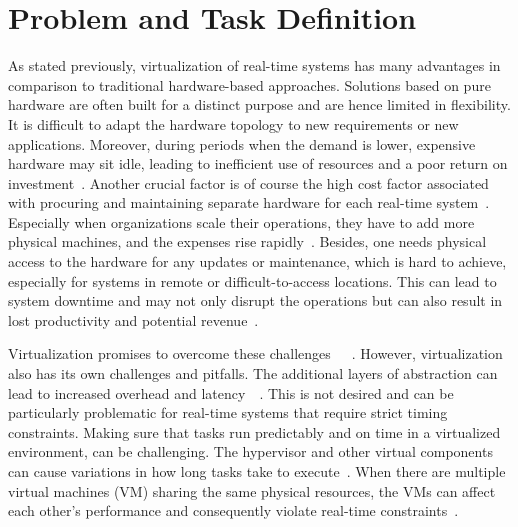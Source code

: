 \documentclass[MMR,Master,english]{twbook}
\begin{document}
\section{Problem and Task Definition}
As stated previously, virtualization of real-time systems has many advantages in comparison to traditional hardware-based approaches. Solutions based on pure hardware are often built for a distinct purpose and are hence limited in flexibility. It is difficult to adapt the hardware topology to new requirements or new applications. Moreover, during periods when the demand is lower, expensive hardware may sit idle, leading to inefficient use of resources and a poor return on investment~\cite{gabrielResourceAwareParameterTuning2019}. Another crucial factor is of course the high cost factor associated with procuring and maintaining separate hardware for each real-time system~\cite{bhardwajVirtualizationCloudComputing2021}. Especially when organizations scale their operations, they have to add more physical machines, and the expenses rise rapidly~\cite{abbasiExploringOpenStackScalable2023}. Besides, one needs physical access to the hardware for any updates or maintenance, which is hard to achieve, especially for systems in remote or difficult-to-access locations. This can lead to system downtime and may not only disrupt the operations but can also result in lost productivity and potential revenue~\cite{mahfoudRealTimePredictiveMaintenanceBased2024}.

\bigskip \noindent Virtualization promises to overcome these challenges~\cite{queirozContainerbasedVirtualizationRealtime2024}~\cite{bhardwajVirtualizationCloudComputing2021}~\cite{cinqueEvaluatingVirtualizationFog2023}. However, virtualization also has its own challenges and pitfalls. The additional layers of abstraction can lead to increased overhead and latency~\cite{casiniLatencyAnalysisVirtualization2021}~\cite{zhangEvaluatingOptimizingVirtualization2010}. This is not desired and can be particularly problematic for real-time systems that require strict timing constraints. Making sure that tasks run predictably and on time in a virtualized environment, can be challenging. The hypervisor and other virtual components can cause variations in how long tasks take to execute~\cite{garcia-vallsChallengesRealtimeVirtualization2014}. When there are multiple virtual machines (VM) sharing the same physical resources, the VMs can affect each other's performance and consequently violate real-time constraints~\cite{queirozContainerbasedVirtualizationRealtime2024}.
\end{document}
